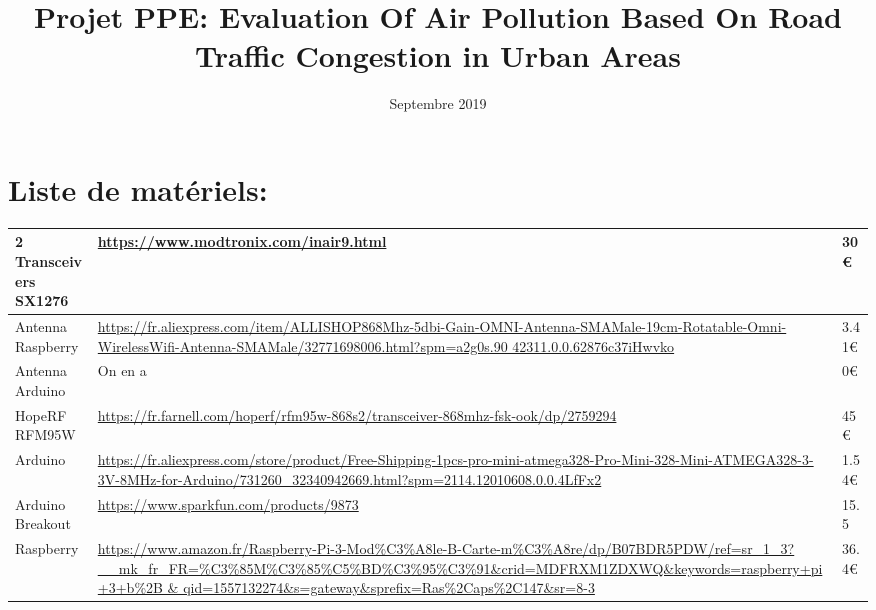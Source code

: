 \documentclass[a4paper]{article}
\title{\textbf{Projet PPE:} Evaluation Of Air Pollution Based On  Road Traffic Congestion in Urban Areas}
\date{Septembre 2019}
\begin{document}
\maketitle

\section*{Liste de matériels:}


\begin{table}[h!]
\scriptsize
	\begin{tabulary}{\textwidth}{L|L|L}
	2 Transceivers SX1276 & \url{https://www.modtronix.com/inair9.html}                                                                                                                                                & 30€ \\\hline        
	Antenna Raspberry     & \url{https://fr.aliexpress.com/item/ALLISHOP868Mhz-5dbi-Gain-OMNI-Antenna-SMAMale-19cm-Rotatable-Omni-WirelessWifi-Antenna-SMAMale/32771698006.html?spm=a2g0s.90 42311.0.0.62876c37iHwvko} & 3.41€  \\\hline     
	Antenna Arduino       & On en a                                                                                                                                                                              & 0€  \\\hline        
	HopeRF RFM95W         & \url{https://fr.farnell.com/hoperf/rfm95w-868s2/transceiver-868mhz-fsk-ook/dp/2759294}                                                                                                     & 45€  \\\hline       
	Arduino               & \url{https://fr.aliexpress.com/store/product/Free-Shipping-1pcs-pro-mini-atmega328-Pro-Mini-328-Mini-ATMEGA328-3-3V-8MHz-for-Arduino/731260_32340942669.html?spm=2114.12010608.0.0.4LfFx2} & 1.54€  \\\hline          
	Arduino Breakout      & \url{https://www.sparkfun.com/products/9873} & 15.5\\\hline       
	Raspberry             & \url{https://www.amazon.fr/Raspberry-Pi-3-Mod\%C3\%A8le-B-Carte-m\%C3\%A8re/dp/B07BDR5PDW/ref=sr_1_3?__mk_fr_FR=\%C3\%85M\%C3\%85\%C5\%BD\%C3\%95\%C3\%91\&crid=MDFRXM1ZDXWQ\&keywords=raspberry+pi+3+b\%2B & qid=1557132274\&s=gateway\&sprefix=Ras\%2Caps\%2C147\&sr=8-3} & 36.4€  \\\hline
	\end{tabulary}
\end{table}
\end{document}
